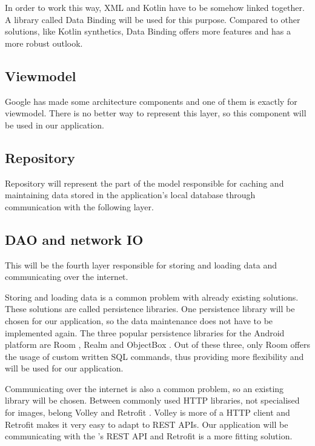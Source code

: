 In order to work this way, XML and Kotlin have to be somehow linked together.
A library called Data Binding will be used for this purpose.
Compared to other solutions, like Kotlin synthetics, Data Binding offers more features and has a more robust outlook.

\subsection{Viewmodel}
Google has made some architecture components and one of them is exactly for viewmodel.
There is no better way to represent this layer, so this component will be used in our application.

\subsection{Repository}
Repository will represent the part of the model responsible for caching and maintaining data stored in the application's local database through communication with the following layer.

\subsection{DAO and network IO}
\label{subsec:daoandnetwork}
This will be the fourth layer responsible for storing and loading data and communicating over the internet.

Storing and loading data is a common problem with already existing solutions.
These solutions are called persistence libraries.
One persistence library will be chosen for our application, so the data maintenance does not have to be implemented again.
The three popular persistence libraries for the Android platform are Room \cite{room}, Realm \cite{realm} and ObjectBox \cite{objectbox}.
Out of these three, only Room offers the usage of custom written SQL commands, thus providing more flexibility and will be used for our application.

Communicating over the internet is also a common problem, so an existing library will be chosen.
Between commonly used HTTP libraries, not specialised for images, belong Volley \cite{volley} and Retrofit \cite{retrofit}.
Volley is more of a HTTP client and Retrofit makes it very easy to adapt to REST APIs.
Our application will be communicating with the \etl 's REST API and Retrofit is a more fitting solution.

